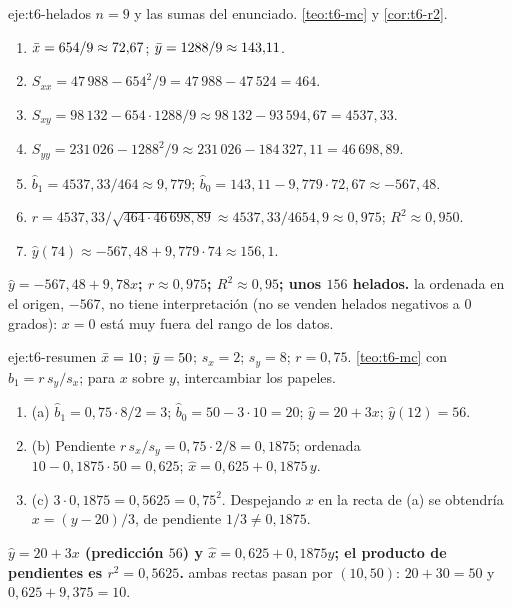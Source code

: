 \begin{solucion}{eje:t6-helados}
\datos $n=9$ y las sumas del enunciado.
\planteamiento \cref{teo:t6-mc} y \cref{cor:t6-r2}.
\pasos
\begin{enumerate}[label=\arabic*.]
  \item $\bar{x}=654/9\approx72{,}67$; $\bar{y}=1288/9\approx143{,}11$.
  \item $S_{xx}=47\,988-654^{2}/9=47\,988-47\,524=464$.
  \item $S_{xy}=98\,132-654\cdot1288/9\approx98\,132-93\,594{,}67=4537{,}33$.
  \item $S_{yy}=231\,026-1288^{2}/9\approx231\,026-184\,327{,}11=46\,698{,}89$.
  \item $\widehat b_1=4537{,}33/464\approx9{,}779$; $\widehat b_0=143{,}11-9{,}779\cdot72{,}67\approx-567{,}48$.
  \item $r=4537{,}33/\sqrt{464\cdot46\,698{,}89}\approx4537{,}33/4654{,}9\approx0{,}975$; $R^{2}\approx0{,}950$.
  \item $\widehat y(74)\approx-567{,}48+9{,}779\cdot74\approx156{,}1$.
\end{enumerate}
\resultado \textbf{$\widehat y=-567{,}48+9{,}78x$; $r\approx0{,}975$; $R^{2}\approx0{,}95$; unos $156$ helados.}
\comprobacion la ordenada en el origen, $-567$, no tiene interpretación (no se venden helados negativos a $0$ grados): $x=0$ está muy fuera del rango de los datos.
\end{solucion}

\begin{solucion}{eje:t6-resumen}
\datos $\bar{x}=10$; $\bar{y}=50$; $s_x=2$; $s_y=8$; $r=0{,}75$.
\planteamiento \cref{teo:t6-mc} con $\widehat b_1=r\,s_y/s_x$; para $x$ sobre $y$, intercambiar los papeles.
\pasos
\begin{enumerate}[label=\arabic*.]
  \item (a) $\widehat b_1=0{,}75\cdot8/2=3$; $\widehat b_0=50-3\cdot10=20$; $\widehat y=20+3x$; $\widehat y(12)=56$.
  \item (b) Pendiente $r\,s_x/s_y=0{,}75\cdot2/8=0{,}1875$; ordenada $10-0{,}1875\cdot50=0{,}625$; $\widehat x=0{,}625+0{,}1875\,y$.
  \item (c) $3\cdot0{,}1875=0{,}5625=0{,}75^{2}$. Despejando $x$ en la recta de (a) se obtendría $x=(y-20)/3$, de pendiente $1/3\neq0{,}1875$.
\end{enumerate}
\resultado \textbf{$\widehat y=20+3x$ (predicción $56$) y $\widehat x=0{,}625+0{,}1875y$; el producto de pendientes es $r^{2}=0{,}5625$.}
\comprobacion ambas rectas pasan por $(10,50)$: $20+30=50$ y $0{,}625+9{,}375=10$.
\end{solucion}

